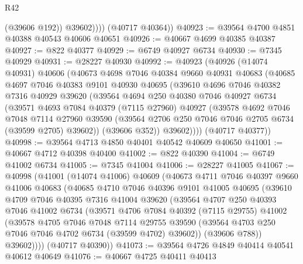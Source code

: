 \begin{lexlean}{R42}
\begin{coremodule}
{                (@39606 @192))
              @39602))))
      (@40717 @40364))
@40923 := @39564 @4700 @4851 @40388 @40543 @40606 @40651
@40926 := @40667 @4699 @40385 @40387
@40927 := @822 @40377
@40929 := @6749 @40927 @6734
@40930 := @7345 @40929
@40931 := @28227 @40930
@40992 := @40923
    (@40926
      (@14074 @40931)
      @40606
      (@40673
        @4698
        @7046
        @40384
        @9660
        @40931
        @40683
        (@40685
          @4697
          @7046
          @40383
          @9101
          @40930
          @40695
          (@39610
            @4696
            @7046
            @40382
            @7316
            @40929
            @39620
            (@39564
              @4694
              @250
              @40380
              @7046
              @40927
              @6734
              (@39571
                @4693
                @7084
                @40379
                (@7115 @27960)
                @40927
                (@39578
                  @4692
                  @7046
                  @7048
                  @7114
                  @27960
                  @39590
                  (@39564 @2706 @250 @7046 @7046 @2705 @6734 (@39599 @2705) @39602))
                (@39606 @352))
              @39602))))
      (@40717 @40377))
@40998 := @39564 @4713 @4850 @40401 @40542 @40609 @40650
@41001 := @40667 @4712 @40398 @40400
@41002 := @822 @40390
@41004 := @6749 @41002 @6734
@41005 := @7345 @41004
@41006 := @28227 @41005
@41067 := @40998
    (@41001
      (@14074 @41006)
      @40609
      (@40673
        @4711
        @7046
        @40397
        @9660
        @41006
        @40683
        (@40685
          @4710
          @7046
          @40396
          @9101
          @41005
          @40695
          (@39610
            @4709
            @7046
            @40395
            @7316
            @41004
            @39620
            (@39564
              @4707
              @250
              @40393
              @7046
              @41002
              @6734
              (@39571
                @4706
                @7084
                @40392
                (@7115 @29755)
                @41002
                (@39578
                  @4705
                  @7046
                  @7048
                  @7114
                  @29755
                  @39590
                  (@39564 @4703 @250 @7046 @7046 @4702 @6734 (@39599 @4702) @39602))
                (@39606 @788))
              @39602))))
      (@40717 @40390))
@41073 := @39564 @4726 @4849 @40414 @40541 @40612 @40649
@41076 := @40667 @4725 @40411 @40413
}
\end{coremodule}
\end{lexlean}
